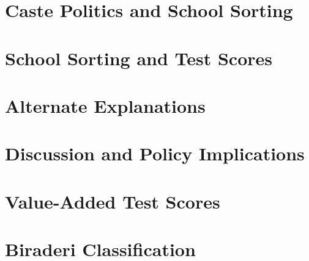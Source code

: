 \documentclass[11pt]{article}
\begin{document}
	

\section{Caste Politics and School Sorting}\label{pk_sorting} %

	


\section{School Sorting and Test Scores}\label{pk_scores}

	


\section{Alternate Explanations}\label{pk_alternatives}

	

\section{Discussion and Policy Implications}\label{pk_conclusion}

	

\pagebreak

	
	

\appendix

\section{Value-Added Test Scores}\label{appendix_valueadded}

	
\clearpage
\section{Biraderi Classification}\label{appendix_classification}

	
\end{document}
